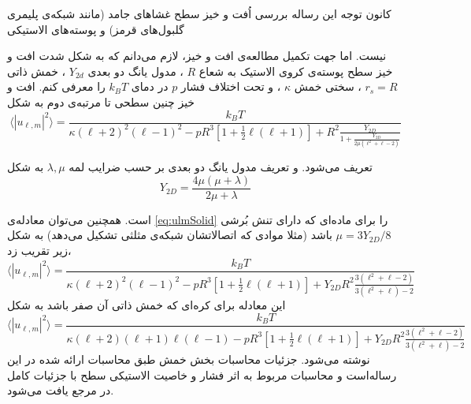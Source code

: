 کانون توجه این رساله بررسی اُفت و خیز سطح غشا‌های جامد (مانند شبکه‌ی پلیمری گلبول‌های قرمز) و پوسته‌های الاستیکی

نیست. اما جهت تکمیل مطالعه‌ی افت و خیز، لازم می‌دانم که به شکل شدت افت و خیز سطح پوسته‌ی کروی الاستیک به شعاع
$R$
، مدول یانگ دو بعدی
$Y_{2d}$
، خمش ذاتی 
$r_s=R$
، سختی خمش
$\kappa$
، و تحت اختلاف فشار 
$p$
در دمای 
$k_BT$
را معرفی کنم. افت و خیز چنین سطحی تا مرتبه‌ی دوم به شکل 
\begin{equation}
\langle|u_{\ell,m}|^2\rangle=\frac{k_BT}{\kappa(\ell+2)^2(\ell-1)^2-pR^3\left[1+\frac{1}{2}\ell(\ell+1)\right]+R^2\frac{Y_{2D}}{1+\frac{Y_{2D}}{2\mu(\ell^2+\ell-2)}}}
\label{eq:ulmSolid}
\end{equation}


تعریف می‌شود. و تعریف مدول یانگ دو بعدی بر حسب ضرایب لمه
$\lambda,\mu$
به شکل
\begin{equation}
Y_{2D}=\frac{4\mu(\mu+\lambda)}{2\mu+\lambda}
\label{eq:youngLame}
\end{equation}

است. همچنین می‌توان معادله‌ی
\ref{eq:ulmSolid}
را برای ماده‌ای که دارای تنش بُرشی 
$\mu=3Y_{2D}/8$
باشد (مثلا موادی که اتصالاتشان شبکه‌ی مثلثی تشکیل می‌دهد) به شکل زیر تقریب زد،
\begin{equation}
\langle|u_{\ell,m}|^2\rangle=\frac{k_BT}{\kappa(\ell+2)^2(\ell-1)^2-pR^3\left[1+\frac{1}{2}\ell(\ell+1)\right]+Y_{2D}R^2\frac{3(\ell^2+\ell-2)}{3(\ell^2+\ell)-2}}
\label{eq:ulmSolidTri}
\end{equation}
این معادله‌ برای کره‌ای که خمش ذاتی آن صفر باشد به شکل
\begin{equation}
\langle|u_{\ell,m}|^2\rangle=\frac{k_BT}{\kappa(\ell+2)(\ell+1)\ell(\ell-1)-pR^3\left[1+\frac{1}{2}\ell(\ell+1)\right]+Y_{2D}R^2\frac{3(\ell^2+\ell-2)}{3(\ell^2+\ell)-2}}
\label{eq:ulmShell}
\end{equation}
نوشته می‌شود. جزئیات محاسبات بخش خمش طبق محاسبات ارائه شده در این رساله‌است و محاسبات مربوط به اثر فشار و خاصیت الاستیکی سطح با جزئیات کامل در مرجع
\cite{gomppernelson2012}
یافت می‌شود.
